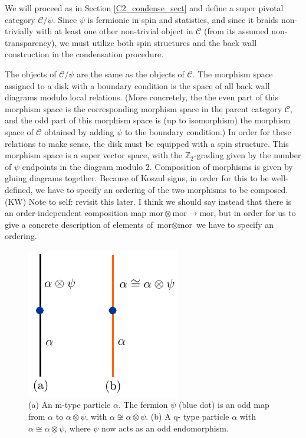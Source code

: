 \documentclass[12pt,a4paper]{article}
\newcommand{\tp}{\otimes}
\newcommand{\mcc}{\mathcal{C}}
\newcommand{\zt}{\mathbb{Z}_2}
\newcommand{\mor}{\text{mor}}
\newcommand{\kw}[1]{{\color{kwcolor}\footnotesize{(KW) #1}}}
\begin{document}
We will proceed 
as in Section \ref{C2_condense_sect} and define a super pivotal category $\mcc/\psi$. 
Since $\psi$ is fermionic in spin and statistics, and since it braids non-trivially with 
at least one other non-trivial object in $\mcc$ (from its assumed non-transparency), we
must utilize both spin structures and the back wall construction in the condensation 
procedure. 

The objects of $\mcc/\psi$ are the same as the objects of $\mcc$.
The morphism space assigned to a disk with a boundary condition is the space of all back wall diagrams
modulo local relations.
(More concretely, the the even part of this morphism space is the corresponding morphism space in the parent category $\mcc$,
and the odd part of this morphism space is (up to isomorphism) the morphism space of $\mcc$ 
obtained by adding $\psi$ to the boundary condition.)
In order for these relations to make sense, the disk must be equipped with a spin structure.
This morphism space is a super vector space, with the $\zt$-grading given by the number of $\psi$ endpoints in the diagram modulo 2.
Composition of morphisms is given by gluing diagrams together.
Because of Koszul signs, in order for this to be well-defined, 
we have to specify an ordering of the two morphisms to be composed.
\kw{Note to self: revisit this later.
I think we should say instead that there is an order-independent composition map $\mor\tp\mor\to\mor$, but in order
for us to give a concrete description of elements of $\mor\tp\mor$ we have to specify an ordering.}

\medskip

\begin{figure}
\begin{center}
\includegraphics{mvsqtype.pdf}
\caption{ \label{mvsqtype} (a) An m-type particle $\alpha$. The fermion $\psi$ (blue dot) is 
an odd map from $\alpha$ to $\alpha\tp \psi$, with $\alpha\not\cong\alpha\tp\psi$. (b) A q-
type particle $\alpha$ with $\alpha\cong\alpha\tp\psi$, where $\psi$ now acts as an odd 
endomorphism.}
\end{center}
\end{figure} 
\end{document}

